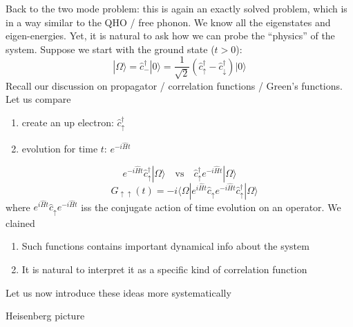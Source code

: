 Back to the two mode problem: this is again an exactly solved problem, which is in a way similar to the QHO / free phonon. We know all the eigenstates and eigen-energies. Yet, it is natural to ask how we can probe the ``physics'' of the system. Suppose we start with the ground state ($t>0$):
\[ |\Omega \rangle =\hat{c}_{-}^{\dagger}|0\rangle =\frac{1}{\sqrt{2}}\left( \hat{c}_{\uparrow}^{\dagger}-\hat{c}_{\downarrow}^{\dagger} \right) |0\rangle \]
Recall our discussion on propagator / correlation functions / Green's functions. Let us compare
\begin{enumerate}
    \item create an up electron: $\hat{c}_\uparrow^\dagger$
    \item evolution for time $t$: $e^{-i\hat{H}t}$
\end{enumerate}
\[ e^{-i\hat{H}t}\hat{c}_{\uparrow}^{\dagger}|\Omega \rangle \quad \mathrm{vs}\quad \hat{c}_{\uparrow}^{\dagger}e^{-i\hat{H}t}|\Omega \rangle \]
\[ \quad G_{\uparrow \uparrow}\left( t \right) =-i\langle \Omega |e^{i\hat{H}t}\hat{c}_{\uparrow}e^{-i\hat{H}t}\hat{c}_{\uparrow}^{\dagger}|\Omega \rangle \]
where $e^{i\hat{H}t}\hat{c}_{\uparrow}e^{-i\hat{H}t}$ iss the conjugate action of time evolution on an operator. We clained
\begin{enumerate}
    \item Such functions contains important dynamical info about the system
    \item It is natural to interpret it as a specific kind of correlation function
\end{enumerate}
Let us now introduce these ideas more systematically

Heisenberg picture

